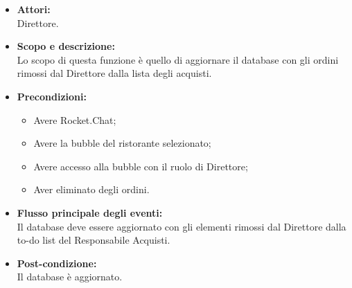
\begin{itemize}
	\item \textbf{Attori:}
	\\Direttore.
	\item \textbf{Scopo e descrizione:} 
	\\Lo scopo di questa funzione è quello di aggiornare il database con gli ordini rimossi dal Direttore dalla lista degli acquisti.
	\item \textbf{Precondizioni:}
	\begin{itemize}
		\item Avere Rocket.Chat;
		\item Avere la bubble del ristorante selezionato;
		\item Avere accesso alla bubble con il ruolo di Direttore;
		\item Aver eliminato degli ordini.
	\end{itemize}
	\item \textbf{Flusso principale degli eventi:}
	\\Il database deve essere aggiornato con gli elementi rimossi dal Direttore dalla to-do list del Responsabile Acquisti.
	\item \textbf{Post-condizione:}
	\\Il database è aggiornato.
\end{itemize}
